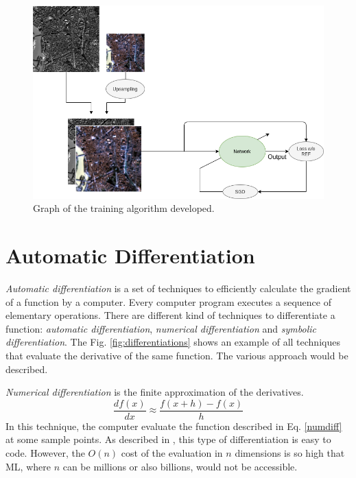 \documentclass[12pt]{report}
\begin{document}
\begin{figure}[t]
    \centering
    \includegraphics[scale=.45]{NOREFTraining.png}
    \caption{Graph of the training algorithm developed.}
    \label{fig:noreftraining}
\end{figure}



\section{Automatic Differentiation}
\textit{Automatic differentiation} is a set of techniques to efficiently calculate the gradient of a function by a computer.
Every computer program executes a sequence of elementary operations.
There are different kind of techniques to differentiate a function: \textit{automatic differentiation}, \textit{numerical differentiation} and \textit{symbolic differentiation}.
The Fig. \ref{fig:differentiations} shows an example of all techniques that
evaluate the derivative of the same function. 
The various approach would be described.

\textit{Numerical differentiation} is the finite approximation of the derivatives.
\begin{equation}
    \frac{df(x)}{dx} \approx \frac{f(x+h) - f(x)}{h}
    \label{numdiff}
\end{equation}
%
In this technique, the computer evaluate the function described in Eq. \ref{numdiff}
at some sample points.
As described in \cite{autodiff}, this type of differentiation is easy to code.
However, the $O(n)$ cost of the evaluation in $n$ dimensions is so high
that ML, where $n$ can be millions or also billions, would not be accessible.
\end{document}
